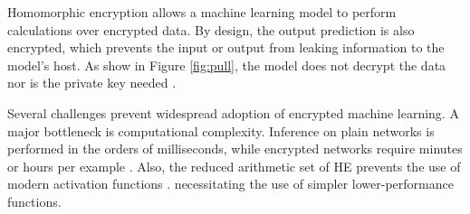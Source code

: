 \documentclass[conference]{IEEEtran}
\begin{document}
Homomorphic encryption \cite{rivest1978data} allows a machine learning model to perform calculations over encrypted data. %
By design, the output prediction is also encrypted, which prevents the input or output from leaking information to the model's host.
As show in Figure \ref{fig:pull}, the model does not decrypt the data nor is the private key needed 
\cite{brakerski2014efficient}.



Several challenges prevent widespread adoption of encrypted machine learning.
A major bottleneck is computational complexity.
Inference on plain networks is performed in the orders of milliseconds,
while encrypted networks require minutes or hours per example \cite{gilad2016cryptonets, hesamifard2017cryptodl}.
Also, the reduced arithmetic set of HE prevents the use of modern activation functions \cite{chabanne2017privacy}.
necessitating the use of simpler lower-performance functions.
\end{document}
